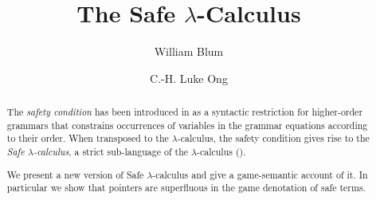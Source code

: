 \documentclass{llncs}
\begin{document}
\frontmatter          %
\pagestyle{headings}  %

\mainmatter              %

\title{The Safe $\lambda$-Calculus}



\author{William Blum \and C.-H. Luke Ong}
%
%



\maketitle              %

\pagestyle{empty}



\begin{abstract}
The \emph{safety condition} has been introduced in \cite{KNU02} as a syntactic
restriction for higher-order grammars that constrains occurrences
of variables in the grammar equations according to their order.
When transposed to the $\lambda$-calculus, the safety condition gives rise to the \emph{Safe $\lambda$-calculus}, a
strict sub-language of the $\lambda$-calculus (\cite{safety-mirlong2004}).

We present a new version of Safe $\lambda$-calculus and give a game-semantic
account of it. In particular we show that pointers are superfluous in the game denotation of safe terms.
\end{abstract}
\end{document}
